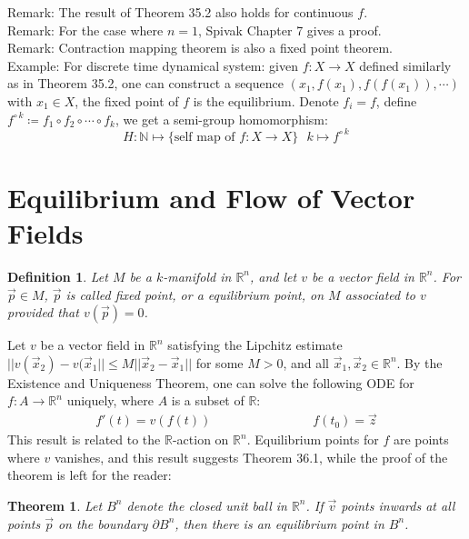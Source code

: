 \documentclass[15pt]{book}
\theoremstyle{break}
\theoremstyle{break}
\newtheorem{thm}{Theorem}[section]
\newtheorem{defn}{Definition}[corL]
\newcommand{\R}{\mathbb{R}}
\newcommand{\N}{\mathbb{N}}
\newcommand{\remark}{\color{blue}Remark: \color{black}}
\newcommand{\example}{\color{green}Example: \color{black}}
\begin{document}
\remark The result of Theorem 35.2 also holds for continuous $f$.\\
\remark For the case where $n=1$, Spivak Chapter 7 gives a proof.\\
\remark Contraction mapping theorem is also a fixed point theorem.\\

\example For discrete time dynamical system: given $f:X \to X$ defined similarly as in Theorem 35.2, one can construct a sequence $(x_1, f(x_1), f(f(x_1)), \cdots)$ with $x_1 \in X$, the fixed point of $f$ is the equilibrium. Denote $f_i = f$, define $f^{\circ\, k} \coloneqq f_1\circ f_2 \circ\cdots \circ f_k$, we get a semi-group homomorphism: 
$$H:\N \mapsto \{\text{self map of }f: X \to X\} \ \ \ k \mapsto f^{\circ \, k}$$





\newpage
\section[Equilibriums and Flows of Vector Fields]{\color{red}Equilibrium and Flow of Vector Fields\color{black}}
\begin{defn}
Let $M$ be a $k$-manifold in $\R^n$, and let $v$ be a vector field in $\R^n$. For $\vec{p} \in M$, $\vec{p}$ is called fixed point, or a equilibrium point, on $M$ associated to $v$ provided that $v(\vec{p}) = 0$. 
\end{defn}


Let $v$ be a vector field in $\R^n$ satisfying the Lipchitz estimate $||v(\vec{x}_2) - v(\vec{x}_1|| \leq M ||\vec{x}_2 - \vec{x}_1||$ for some $M>0$, and all $\vec{x}_1,\vec{x}_2 \in \R^n$. By the Existence and Uniqueness Theorem, one can solve the following ODE for $f:A \to \R^n$ uniquely, where $A$ is a subset of $\R$:
\begin{align*}
f'(t) = v(f(t)) \qquad\qquad\qquad\qquad f(t_0 ) = \vec{z} 
\end{align*}
This result is related to the $\R$-action on $\R^n$. Equilibrium points for $f$ are points where $v$ vanishes, and this result suggests Theorem 36.1, while the proof of the theorem is left for the reader:
\begin{thm}
Let $B^n$ denote the closed unit ball in $\R^n$. If $\vec{v}$ points inwards at all points $\vec{p}$ on the boundary $\partial B^n$, then there is an equilibrium point in $B^n$. 
\end{thm}
\hfill\break
\end{document}
